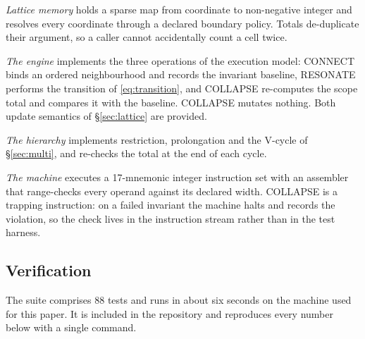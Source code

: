 \documentclass[11pt,a4paper]{article}
\theoremstyle{definition}
\begin{document}
\emph{Lattice memory} holds a sparse map from coordinate to non-negative
integer and resolves every coordinate through a declared boundary policy.
Totals de-duplicate their argument, so a caller cannot accidentally count a
cell twice.

\emph{The engine} implements the three operations of the execution model:
CONNECT binds an ordered neighbourhood and records the invariant baseline,
RESONATE performs the transition of \eqref{eq:transition}, and COLLAPSE
re-computes the scope total and compares it with the baseline. COLLAPSE
mutates nothing. Both update semantics of \S\ref{sec:lattice} are provided.

\emph{The hierarchy} implements restriction, prolongation and the V-cycle of
\S\ref{sec:multi}, and re-checks the total at the end of each cycle.

\emph{The machine} executes a 17-mnemonic integer instruction set with an
assembler that range-checks every operand against its declared width. COLLAPSE
is a trapping instruction: on a failed invariant the machine halts and records
the violation, so the check lives in the instruction stream rather than in the
test harness.

\subsection{Verification}

The suite comprises 88 tests and runs in about six seconds on the machine used
for this paper. It is included in the repository and reproduces every number
below with a single command.
\end{document}
